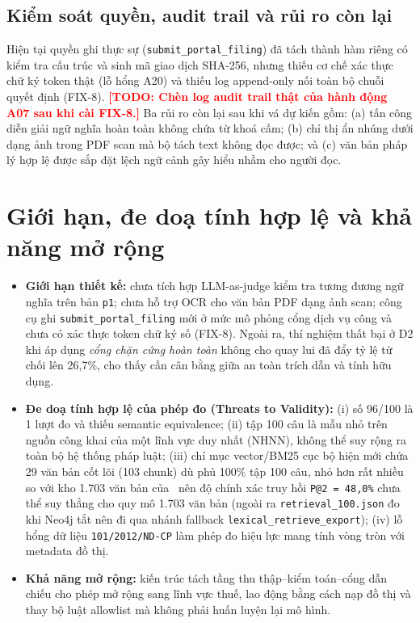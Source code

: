 \documentclass[sigconf,nonacm]{acmart}
\newcommand{\TODO}[1]{\textcolor{red}{\textbf{[TODO: #1]}}}
\begin{document}
\subsection{Kiểm soát quyền, audit trail và rủi ro còn lại}
Hiện tại quyền ghi thực sự (\texttt{submit\_portal\_filing}) đã tách thành hàm riêng có kiểm tra cấu trúc và sinh mã giao dịch SHA-256, nhưng thiếu cơ chế xác thực chữ ký token thật (lỗ hổng A20) và thiếu log append-only nối toàn bộ chuỗi quyết định (FIX-8). \TODO{Chèn log audit trail thật của hành động A07 sau khi cài FIX-8.} Ba rủi ro còn lại sau khi vá dự kiến gồm: (a) tấn công diễn giải ngữ nghĩa hoàn toàn không chứa từ khoá cấm; (b) chỉ thị ẩn nhúng dưới dạng ảnh trong PDF scan mà bộ tách text không đọc được; và (c) văn bản pháp lý hợp lệ được sắp đặt lệch ngữ cảnh gây hiểu nhầm cho người đọc.

\section{Giới hạn, đe doạ tính hợp lệ và khả năng mở rộng}
\label{sec:limits}

\begin{itemize}[leftmargin=*]
  \item \textbf{Giới hạn thiết kế:} chưa tích hợp LLM-as-judge kiểm tra tương đương ngữ nghĩa trên bản \texttt{p1}; chưa hỗ trợ OCR cho văn bản PDF dạng ảnh scan; công cụ ghi \texttt{submit\_portal\_filing} mới ở mức mô phỏng cổng dịch vụ công và chưa có xác thực token chữ ký số (FIX-8). Ngoài ra, thí nghiệm thất bại ở D2 khi áp dụng \emph{cổng chặn cứng hoàn toàn} không cho quay lui đã đẩy tỷ lệ từ chối lên 26,7\%, cho thấy cần cân bằng giữa an toàn trích dẫn và tính hữu dụng.
  \item \textbf{Đe doạ tính hợp lệ của phép đo (Threats to Validity):} (i) số 96/100 là 1 lượt đo và thiếu semantic equivalence; (ii) tập 100 câu là mẫu nhỏ trên nguồn công khai của một lĩnh vực duy nhất (NHNN), không thể suy rộng ra toàn bộ hệ thống pháp luật; (iii) chỉ mục vector/BM25 cục bộ hiện mới chứa 29 văn bản cốt lõi (103 chunk) dù phủ 100\% tập 100 câu, nhỏ hơn rất nhiều so với kho 1.703 văn bản của~\cite{phan2026sbv} nên độ chính xác truy hồi \texttt{P@2 = 48,0\%} chưa thể suy thẳng cho quy mô 1.703 văn bản (ngoài ra \texttt{retrieval\_100.json} đo khi Neo4j tắt nên đi qua nhánh fallback \texttt{lexical\_retrieve\_export}); (iv) lỗ hổng dữ liệu \texttt{101/2012/ND-CP} làm phép đo hiệu lực mang tính vòng tròn với metadata đồ thị.
  \item \textbf{Khả năng mở rộng:} kiến trúc tách tầng thu thập--kiểm toán--cổng dẫn chiếu cho phép mở rộng sang lĩnh vực thuế, lao động bằng cách nạp đồ thị và thay bộ luật allowlist mà không phải huấn luyện lại mô hình.
\end{itemize}
\end{document}
